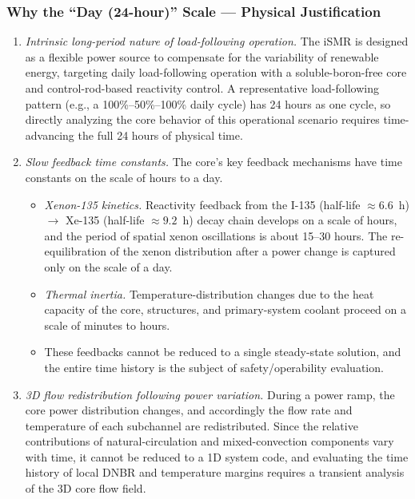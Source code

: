 \documentclass[review]{elsarticle}
\begin{document}
\subsubsection{Why the ``Day (24-hour)'' Scale --- Physical Justification}
\begin{enumerate}
  \item \emph{Intrinsic long-period nature of load-following operation.} The iSMR is designed as a flexible power source to compensate for the variability of renewable energy, targeting daily load-following operation with a soluble-boron-free core and control-rod-based reactivity control. A representative load-following pattern (e.g., a 100\%--50\%--100\% daily cycle) has 24 hours as one cycle, so directly analyzing the core behavior of this operational scenario requires time-advancing the full 24 hours of physical time.
  \item \emph{Slow feedback time constants.} The core's key feedback mechanisms have time constants on the scale of hours to a day.
  \begin{itemize}
    \item \emph{Xenon-135 kinetics.} Reactivity feedback from the I-135 (half-life $\approx 6.6$~h) $\rightarrow$ Xe-135 (half-life $\approx 9.2$~h) decay chain develops on a scale of hours, and the period of spatial xenon oscillations is about 15--30 hours. The re-equilibration of the xenon distribution after a power change is captured only on the scale of a day.
    \item \emph{Thermal inertia.} Temperature-distribution changes due to the heat capacity of the core, structures, and primary-system coolant proceed on a scale of minutes to hours.
    \item These feedbacks cannot be reduced to a single steady-state solution, and the entire time history is the subject of safety/operability evaluation.
  \end{itemize}
  \item \emph{3D flow redistribution following power variation.} During a power ramp, the core power distribution changes, and accordingly the flow rate and temperature of each subchannel are redistributed. Since the relative contributions of natural-circulation and mixed-convection components vary with time, it cannot be reduced to a 1D system code, and evaluating the time history of local DNBR and temperature margins requires a transient analysis of the 3D core flow field.
\end{enumerate}
\end{document}
